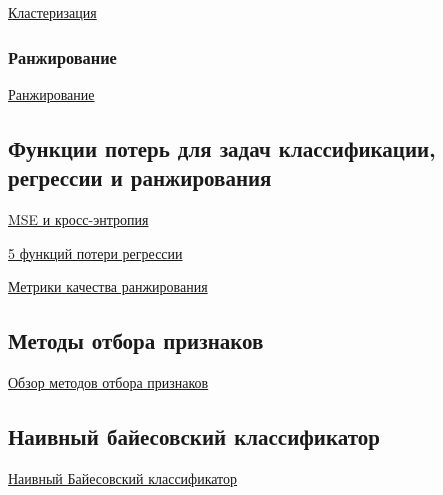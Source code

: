 \documentclass{article}
\begin{document}
\href{https://datascience.eu/ru/%D0%BC%D0%B0%D1%88%D0%B8%D0%BD%D0%BD%D0%BE%D0%B5-%D0%BE%D0%B1%D1%83%D1%87%D0%B5%D0%BD%D0%B8%D0%B5/%D0%BA%D0%BB%D0%B0%D1%81%D1%82%D0%B5%D1%80%D0%BD%D1%8B%D0%B5-%D0%B0%D0%BB%D0%B3%D0%BE%D1%80%D0%B8%D1%82%D0%BC%D1%8B-%D0%B8-%D0%B8%D1%85-%D0%B7%D0%BD%D0%B0%D1%87%D0%B5%D0%BD%D0%B8%D0%B5-%D0%B2-%D0%BC/}{Кластеризация}

\subsubsection{Ранжирование}

\href{https://neerc.ifmo.ru/wiki/index.php?title=%D0%A0%D0%B0%D0%BD%D0%B6%D0%B8%D1%80%D0%BE%D0%B2%D0%B0%D0%BD%D0%B8%D0%B5}{Ранжирование}


\subsection{Функции потерь для задач классификации, регрессии и ранжирования}

\href{https://id-lab.ru/posts/developers/funkcii/}{MSE и кросс-энтропия}

\href{https://russianblogs.com/article/6840440533/}{5 функций потери регрессии}

\href{https://neerc.ifmo.ru/wiki/index.php?title=%D0%A0%D0%B0%D0%BD%D0%B6%D0%B8%D1%80%D0%BE%D0%B2%D0%B0%D0%BD%D0%B8%D0%B5}{Метрики качества ранжирования}


\subsection{Методы отбора признаков}

\href{https://habr.com/ru/company/jetinfosystems/blog/470622/}{Обзор методов отбора признаков}

\subsection{Наивный байесовский классификатор}

\href{https://ru.wikipedia.org/wiki/%D0%9D%D0%B0%D0%B8%D0%B2%D0%BD%D1%8B%D0%B9_%D0%B1%D0%B0%D0%B9%D0%B5%D1%81%D0%BE%D0%B2%D1%81%D0%BA%D0%B8%D0%B9_%D0%BA%D0%BB%D0%B0%D1%81%D1%81%D0%B8%D1%84%D0%B8%D0%BA%D0%B0%D1%82%D0%BE%D1%80#:~:text=%D0%9D%D0%B0%D0%B8%CC%81%D0%B2%D0%BD%D1%8B%D0%B9%20%D0%B1%D0%B0%CC%81%D0%B9%D0%B5%D1%81%D0%BE%D0%B2%D1%81%D0%BA%D0%B8%D0%B9%20%D0%BA%D0%BB%D0%B0%D1%81%D1%81%D0%B8%D1%84%D0%B8%D0%BA%D0%B0%CC%81%D1%82%D0%BE%D1%80%20%E2%80%94%20%D0%BF%D1%80%D0%BE%D1%81%D1%82%D0%BE%D0%B9%20%D0%B2%D0%B5%D1%80%D0%BE%D1%8F%D1%82%D0%BD%D0%BE%D1%81%D1%82%D0%BD%D1%8B%D0%B9,%D0%BA%D0%BB%D0%B0%D1%81%D1%81%D0%B8%D1%84%D0%B8%D0%BA%D0%B0%D1%82%D0%BE%D1%80%D1%8B%20%D0%BC%D0%BE%D0%B3%D1%83%D1%82%20%D0%BE%D0%B1%D1%83%D1%87%D0%B0%D1%82%D1%8C%D1%81%D1%8F%20%D0%BE%D1%87%D0%B5%D0%BD%D1%8C%20%D1%8D%D1%84%D1%84%D0%B5%D0%BA%D1%82%D0%B8%D0%B2%D0%BD%D0%BE.}{Наивный Байесовский классификатор}
\end{document}
